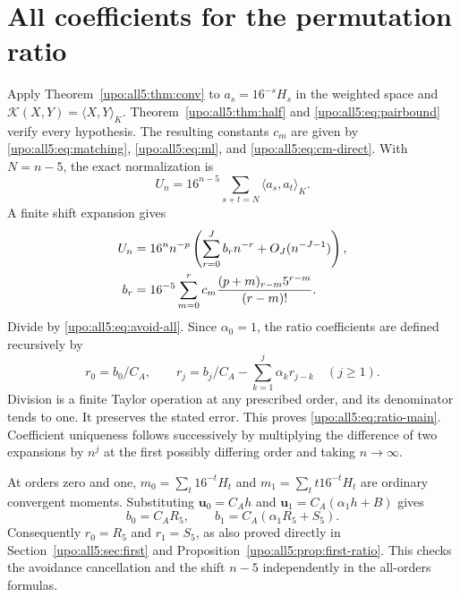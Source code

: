 \documentclass[11pt,letterpaper]{article}
\theoremstyle{remark}\newtheorem{remark}[theorem]{Remark}
\numberwithin{equation}{section}
\newcommand{\rise}[2]{(#1)_{#2}}
\newcommand{\pair}[2]{\langle #1,#2\rangle_K}
\newcommand{\bfU}{\boldsymbol u}
\begin{document}
\section{All coefficients for the permutation ratio}\label{upo:all5:sec:application}
Apply Theorem~\ref{upo:all5:thm:conv} to $a_s=16^{-s}H_s$ in the weighted
space and $\mathcal K(X,Y)=\pair XY$. Theorem~\ref{upo:all5:thm:half} and
\eqref{upo:all5:eq:pairbound} verify every hypothesis. The resulting constants
$c_m$ are given by \eqref{upo:all5:eq:matching}, \eqref{upo:all5:eq:ml}, and
\eqref{upo:all5:eq:cm-direct}. With $N=n-5$, the exact normalization is
\begin{equation}\label{upo:all5:eq:normalization}
 U_n=16^{n-5}\sum_{s+t=N}\pair{a_s}{a_t}.
\end{equation}
A finite shift expansion gives
\begin{align}\label{upo:all5:eq:bcoeff}
 U_n&=16^n n^{-p}
       \left(\sum_{r=0}^Jb_r n^{-r}+O_J(n^{-J-1})\right),\notag\\
 b_r&=16^{-5}\sum_{m=0}^r
        c_m\frac{\rise{p+m}{r-m}5^{r-m}}{(r-m)!}.
\end{align}
Divide by \eqref{upo:all5:eq:avoid-all}. Since $\alpha_0=1$, the ratio
coefficients are defined recursively by
\begin{equation}\label{upo:all5:eq:rcoeff}
 r_0=b_0/C_A,\qquad
 r_j=b_j/C_A-\sum_{k=1}^j\alpha_k r_{j-k}\quad(j\ge1).
\end{equation}
Division is a finite Taylor operation at any prescribed order,
and its denominator tends to one. It preserves the stated error.
This proves \eqref{upo:all5:eq:ratio-main}. Coefficient uniqueness follows
successively by multiplying the difference of two expansions by
$n^j$ at the first possibly differing order and taking $n\to\infty$.

At orders zero and one,
$m_0=\sum_t16^{-t}H_t$ and $m_1=\sum_t t16^{-t}H_t$ are ordinary
convergent moments. Substituting
$\bfU_0=C_Ah$ and $\bfU_1=C_A(\alpha_1h+B)$ gives
\[
 b_0=C_AR_5,\qquad b_1=C_A(\alpha_1R_5+S_5).
\]
Consequently $r_0=R_5$ and $r_1=S_5$, as also proved directly in
Section~\ref{upo:all5:sec:first} and Proposition~\ref{upo:all5:prop:first-ratio}.
This checks the avoidance cancellation and the shift $n-5$
independently in the all-orders formulas.
\end{document}

